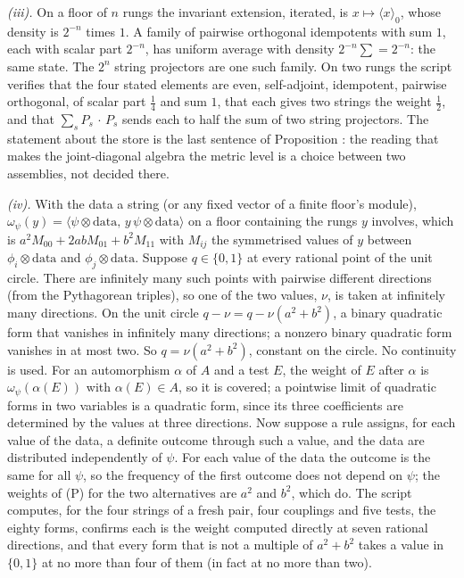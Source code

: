 \emph{(iii).} On a floor of $n$ rungs the invariant extension, iterated, is $x \mapsto \langle x\rangle_{0}$, whose density is $2^{-n}$ times $1$. A family of pairwise orthogonal idempotents with sum $1$, each with scalar part $2^{-n}$, has uniform average with density $2^{-n}\sum = 2^{-n}$: the same state. The $2^{n}$ string projectors are one such family. On two rungs the script verifies that the four stated elements are even, self-adjoint, idempotent, pairwise orthogonal, of scalar part $\tfrac14$ and sum $1$, that each gives two strings the weight $\tfrac12$, and that $\sum_{s}P_{s}\,\cdot\,P_{s}$ sends each to half the sum of two string projectors. The statement about the store is the last sentence of Proposition : the reading that makes the joint-diagonal algebra the metric level is a choice between two assemblies, not decided there.

\emph{(iv).} With the data a string (or any fixed vector of a finite floor's module), $\omega_{\psi}(y) = \langle\psi \otimes \mathrm{data},\, y\,\psi \otimes \mathrm{data}\rangle$ on a floor containing the rungs $y$ involves, which is $a^{2}M_{00} + 2abM_{01} + b^{2}M_{11}$ with $M_{ij}$ the symmetrised values of $y$ between $\phi_{i} \otimes \mathrm{data}$ and $\phi_{j} \otimes \mathrm{data}$. Suppose $q \in \{0, 1\}$ at every rational point of the unit circle. There are infinitely many such points with pairwise different directions (from the Pythagorean triples), so one of the two values, $\nu$, is taken at infinitely many directions. On the unit circle $q - \nu = q - \nu(a^{2} + b^{2})$, a binary quadratic form that vanishes in infinitely many directions; a nonzero binary quadratic form vanishes in at most two. So $q = \nu(a^{2} + b^{2})$, constant on the circle. No continuity is used. For an automorphism $\alpha$ of $A$ and a test $E$, the weight of $E$ after $\alpha$ is $\omega_{\psi}(\alpha(E))$ with $\alpha(E) \in A$, so it is covered; a pointwise limit of quadratic forms in two variables is a quadratic form, since its three coefficients are determined by the values at three directions. Now suppose a rule assigns, for each value of the data, a definite outcome through such a value, and the data are distributed independently of $\psi$. For each value of the data the outcome is the same for all $\psi$, so the frequency of the first outcome does not depend on $\psi$; the weights of (P) for the two alternatives are $a^{2}$ and $b^{2}$, which do. The script computes, for the four strings of a fresh pair, four couplings and five tests, the eighty forms, confirms each is the weight computed directly at seven rational directions, and that every form that is not a multiple of $a^{2} + b^{2}$ takes a value in $\{0, 1\}$ at no more than four of them (in fact at no more than two).


